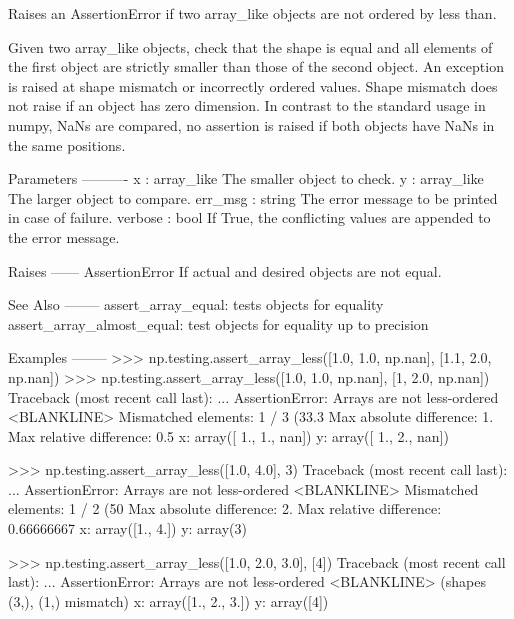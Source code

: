 \begin{DoxyVerb}Raises an AssertionError if two array_like objects are not ordered by less
than.

Given two array_like objects, check that the shape is equal and all
elements of the first object are strictly smaller than those of the
second object. An exception is raised at shape mismatch or incorrectly
ordered values. Shape mismatch does not raise if an object has zero
dimension. In contrast to the standard usage in numpy, NaNs are
compared, no assertion is raised if both objects have NaNs in the same
positions.



Parameters
----------
x : array_like
  The smaller object to check.
y : array_like
  The larger object to compare.
err_msg : string
  The error message to be printed in case of failure.
verbose : bool
    If True, the conflicting values are appended to the error message.

Raises
------
AssertionError
  If actual and desired objects are not equal.

See Also
--------
assert_array_equal: tests objects for equality
assert_array_almost_equal: test objects for equality up to precision



Examples
--------
>>> np.testing.assert_array_less([1.0, 1.0, np.nan], [1.1, 2.0, np.nan])
>>> np.testing.assert_array_less([1.0, 1.0, np.nan], [1, 2.0, np.nan])
Traceback (most recent call last):
    ...
AssertionError:
Arrays are not less-ordered
<BLANKLINE>
Mismatched elements: 1 / 3 (33.3%
Max absolute difference: 1.
Max relative difference: 0.5
 x: array([ 1.,  1., nan])
 y: array([ 1.,  2., nan])

>>> np.testing.assert_array_less([1.0, 4.0], 3)
Traceback (most recent call last):
    ...
AssertionError:
Arrays are not less-ordered
<BLANKLINE>
Mismatched elements: 1 / 2 (50%
Max absolute difference: 2.
Max relative difference: 0.66666667
 x: array([1., 4.])
 y: array(3)

>>> np.testing.assert_array_less([1.0, 2.0, 3.0], [4])
Traceback (most recent call last):
    ...
AssertionError:
Arrays are not less-ordered
<BLANKLINE>
(shapes (3,), (1,) mismatch)
 x: array([1., 2., 3.])
 y: array([4])\end{DoxyVerb}
 \mbox{\label{namespacenumpy_1_1testing_1_1__private_1_1utils_ab3937c62090eaf83fd16920e81bc51a2}} 
